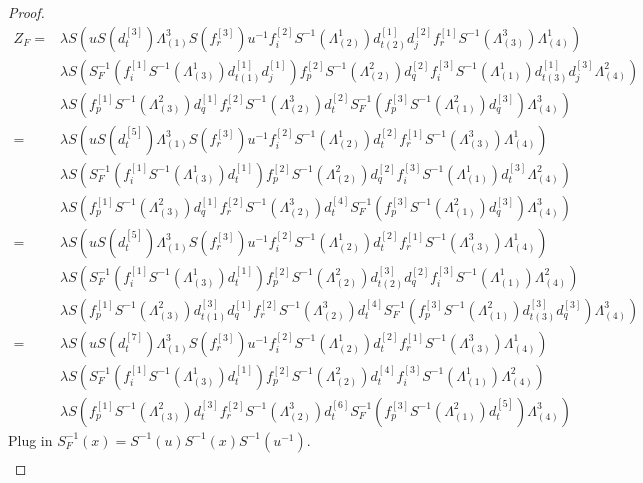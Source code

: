 \documentclass[12pt]{amsart}
\begin{document}
\begin{proof}
\[\begin{aligned}
Z_F
=&\lambda S(uS(d^{[3]}_t)\Lambda^3_{(1)}S(f^{[3]}_r)u^{-1}f^{[2]}_iS^{-1}(\Lambda^1_{(2)})d^{[1]}_{t(2)}d^{[2]}_jf^{[1]}_rS^{-1}(\Lambda^3_{(3)})\Lambda^1_{(4)})\\
&\lambda S(S_F^{-1}(f^{[1]}_iS^{-1}(\Lambda^1_{(3)})d^{[1]}_{t(1)}d^{[1]}_j)f^{[2]}_pS^{-1}(\Lambda^2_{(2)})d^{[2]}_qf^{[3]}_iS^{-1}(\Lambda^1_{(1)})d^{[1]}_{t(3)}d^{[3]}_j\Lambda^2_{(4)})\\
&\lambda S(f^{[1]}_pS^{-1}(\Lambda^2_{(3)})d^{[1]}_qf^{[2]}_rS^{-1}(\Lambda^3_{(2)})d^{[2]}_tS_F^{-1}(f^{[3]}_pS^{-1}(\Lambda^2_{(1)})d^{[3]}_q)\Lambda^3_{(4)})\\
=&\lambda S(uS(d^{[5]}_t)\Lambda^3_{(1)}S(f^{[3]}_r)u^{-1}f^{[2]}_iS^{-1}(\Lambda^1_{(2)})d^{[2]}_tf^{[1]}_rS^{-1}(\Lambda^3_{(3)})\Lambda^1_{(4)})\\
&\lambda S(S_F^{-1}(f^{[1]}_iS^{-1}(\Lambda^1_{(3)})d^{[1]}_t)f^{[2]}_pS^{-1}(\Lambda^2_{(2)})d^{[2]}_qf^{[3]}_iS^{-1}(\Lambda^1_{(1)})d^{[3]}_t\Lambda^2_{(4)})\\
&\lambda S(f^{[1]}_pS^{-1}(\Lambda^2_{(3)})d^{[1]}_qf^{[2]}_rS^{-1}(\Lambda^3_{(2)})d^{[4]}_tS_F^{-1}(f^{[3]}_pS^{-1}(\Lambda^2_{(1)})d^{[3]}_q)\Lambda^3_{(4)})\\
=&\lambda S(uS(d^{[5]}_t)\Lambda^3_{(1)}S(f^{[3]}_r)u^{-1}f^{[2]}_iS^{-1}(\Lambda^1_{(2)})d^{[2]}_tf^{[1]}_rS^{-1}(\Lambda^3_{(3)})\Lambda^1_{(4)})\\
&\lambda S(S_F^{-1}(f^{[1]}_iS^{-1}(\Lambda^1_{(3)})d^{[1]}_t)f^{[2]}_pS^{-1}(\Lambda^2_{(2)})d^{[3]}_{t(2)}d^{[2]}_qf^{[3]}_iS^{-1}(\Lambda^1_{(1)})\Lambda^2_{(4)})\\
&\lambda S(f^{[1]}_pS^{-1}(\Lambda^2_{(3)})d^{[3]}_{t(1)}d^{[1]}_qf^{[2]}_rS^{-1}(\Lambda^3_{(2)})d^{[4]}_tS_F^{-1}(f^{[3]}_pS^{-1}(\Lambda^2_{(1)})d^{[3]}_{t(3)}d^{[3]}_q)\Lambda^3_{(4)})\\
=&\lambda S(uS(d^{[7]}_t)\Lambda^3_{(1)}S(f^{[3]}_r)u^{-1}f^{[2]}_iS^{-1}(\Lambda^1_{(2)})d^{[2]}_tf^{[1]}_rS^{-1}(\Lambda^3_{(3)})\Lambda^1_{(4)})\\
&\lambda S(S_F^{-1}(f^{[1]}_iS^{-1}(\Lambda^1_{(3)})d^{[1]}_t)f^{[2]}_pS^{-1}(\Lambda^2_{(2)})d^{[4]}_tf^{[3]}_iS^{-1}(\Lambda^1_{(1)})\Lambda^2_{(4)})\\
&\lambda S(f^{[1]}_pS^{-1}(\Lambda^2_{(3)})d^{[3]}_tf^{[2]}_rS^{-1}(\Lambda^3_{(2)})d^{[6]}_tS_F^{-1}(f^{[3]}_pS^{-1}(\Lambda^2_{(1)})d^{[5]}_t)\Lambda^3_{(4)})
\end{aligned}\]
Plug in $S_F^{-1}(x)=S^{-1}(u)S^{-1}(x)S^{-1}(u^{-1})$.
\[\begin{aligned}

\end{aligned}\]
\end{proof}
\end{document}

